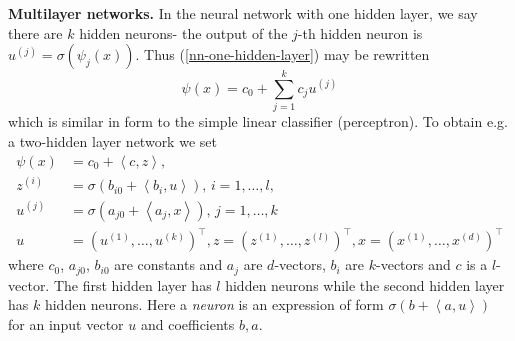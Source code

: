 \documentclass[11pt,twoside]{article}%
\theoremstyle{change}
\begin{document}
\textbf{Multilayer networks. }In the neural network with one hidden layer, we
say there are $k$ hidden neurons- the output of the $j$-th hidden neuron is
$u^{(j)}=\sigma(\psi_{j}\left(  x\right)  )$. Thus (\ref{nn-one-hidden-layer})
may be rewritten
\[
\psi(x)=c_{0}+\sum_{j=1}^{k}c_{j}u^{(j)}%
\]
which is similar in form to the simple linear classifier (perceptron). To
obtain e.g. a two-hidden layer network we set
\begin{align}
\psi(x) &  =c_{0}+\left\langle c,z\right\rangle ,\label{nn-two-hid-lay-1}\\
z^{(i)} &  =\sigma\left(  b_{i0}+\left\langle b_{i},u\right\rangle \right)
\text{, }i=1,\ldots,l,\nonumber\\
u^{(j)} &  =\sigma\left(  a_{j0}+\left\langle a_{j},x\right\rangle \right)
\text{, }j=1,\ldots,k\nonumber\\
u &  =(u^{(1)},\ldots,u^{(k)})^{\top},z=(z^{(1)},\ldots,z^{(l)})^{\top
},x=(x^{(1)},\ldots,x^{(d)})^{\top}%
\end{align}
where $c_{0}$, $a_{j0}$, $b_{i0}$ are constants and $a_{j}$ are $d$-vectors,
$b_{i}$ are $k$-vectors and $c$ is a $l$-vector. The first hidden layer has
$l$ hidden neurons while the second hidden layer has $k$ hidden neurons. Here
a \textit{neuron} is an expression of form $\sigma\left(  b+\left\langle
a,u\right\rangle \right)  $ for an input vector $u$ and coefficients $b,a$.

\bigskip
\end{document}
